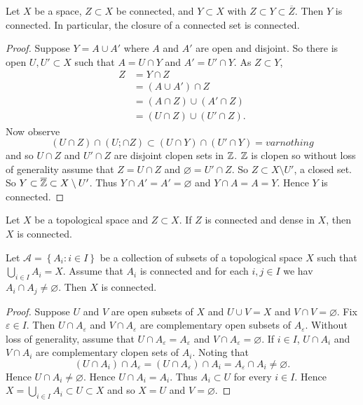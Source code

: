 
\begin{proposition}[]
	Let $X$ be a space,
	$Z \subset X$ be connected, and $Y \subset X$ with 
	$Z \subset Y \subset \overline Z$.
	Then $Y$ is connected.
	In particular, the closure of a connected set is connected.
\end{proposition}

\begin{proof}
	Suppose $Y = A \cup A'$ where $A$ and $A'$ are open and disjoint.
	So there is open $U,U' \subset X$ such that $A = U \cap Y$ and
	$A' = U' \cap Y$.
	As $Z \subset Y$,
	\begin{align*}
		Z &= Y \cap Z \\
		  &= (A \cup A') \cap Z \\
		  &= (A \cap Z) \cup (A' \cap Z) \\
		  &= (U \cap Z) \cup (U' \cap Z).
	\end{align*}
	Now observe
	\[
		(U \cap Z) \cap (U; \cap Z) \subset (U \cap Y) \cap (U' \cap Y)
		= varnothing
	\]
	and so $U \cap Z$ and $U' \cap Z$ are disjoint clopen sets in $\mathbb{Z}$.
	$\mathbb{Z}$ is clopen so without loss of generality assume that
	$Z = U \cap Z$ and $\varnothing = U' \cap Z$.
	So $Z \subset X \setminus U'$, a closed set.
	So $Y \subset \overline {\mathbb{Z}} \subset X \setminus U'$.
	Thus $Y \cap A' = A' = \varnothing$
	and $Y \cap A = A = Y$.
	Hence $Y$ is connected.
\end{proof}

\begin{corollary}
	Let $X$ be a topological space and $Z \subset X$.
	If $Z$ is connected and dense in $X$, then $X$ is connected.
\end{corollary}

\begin{proposition}[]
	Let $\mathcal A = \left\{
		A_i: i \in I
	\right\}$
	be a collection of subsets of a topological space $X$ such that
	$\bigcup_{i \in I} A_i = X$.
	Assume that $A_i$ is connected and for each $i,j \in I$ we hav
	$A_i \cap A_j \neq \varnothing$.
	Then $X$ is connected.
\end{proposition}

\begin{proof}
	Suppose $U$ and $V$ are open subsets of $X$ and 
	$U \cup V  = X$ and $V \cap V = \varnothing$.
	Fix $\varepsilon \in I$.
	Then $U \cap A_\varepsilon$ and $V \cap A_\varepsilon$ are
	complementary open subsets of $A_\varepsilon$.
	Without loss of generality, assume that $U \cap A_\varepsilon
	= A_\varepsilon$ and $V \cap A_\varepsilon = \varnothing$.
	If $i \in I$, $U \cap A_i$ and $V \cap A_i$ are complementary
	clopen sets of $A_i$.
	Noting that
	\[
		(U \cap A_i) \cap A_\varepsilon
		= (U \cap A_\varepsilon) \cap A_i
		= A_\varepsilon \cap A_i \neq \varnothing.
	\]
	Hence $U \cap A_i \neq \varnothing$.
	Hence $U \cap A_i = A_i$.
	Thus $A_i \subset U$ for every $i \in I$.
	Hence
	$X = \bigcup_{i\in I} A_i \subset U \subset X$
	and so $X = U$ and $V = \varnothing$.
\end{proof}

